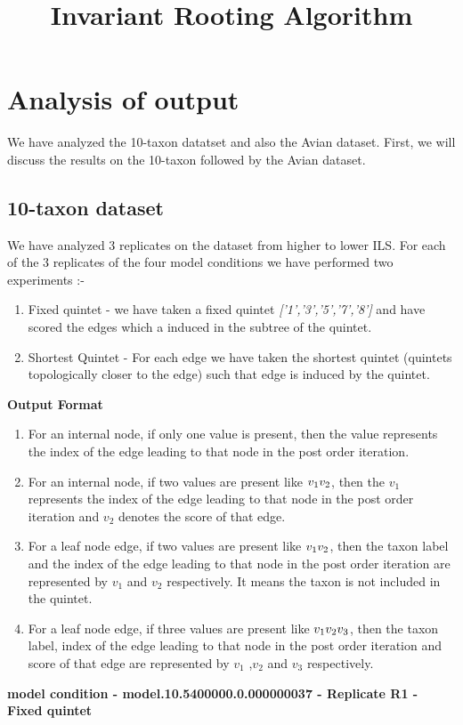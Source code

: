 \documentclass[letterpaper, 12pt]{article}
\title{ Invariant  Rooting  Algorithm }
\begin{document}
\maketitle

\section{Analysis of output}

 We have analyzed the 10-taxon datatset and also the Avian dataset. First, we will discuss the results on the 10-taxon followed by the Avian dataset.
 
 \subsection{10-taxon dataset}
 
 We have analyzed 3 replicates on the  dataset from higher to lower ILS. For each of the 3 replicates of the four model conditions we have performed two experiments :-
 
 \begin{enumerate}
 \item Fixed quintet - we have taken a fixed quintet {\em ['1','3','5','7','8'] } and have scored the edges which a induced in the subtree of the quintet. 
 \item Shortest Quintet - For each edge we have taken the shortest quintet (quintets topologically closer to the edge) such that edge is induced by the quintet.
 \end{enumerate}
 
 {\bf Output Format }
 \begin{enumerate}
 \item For an internal node, if only one value is present, then the value represents the index of the edge leading to that node in the post order iteration.
 \item For an internal node, if two values are present like $v_1\/v_2$, then the $v_1$ represents the index of the edge leading to that node in the post order iteration and $v_2$ denotes the score of that edge.
  \item For a leaf node edge, if two values are present like $v_1\/v_2$, then the taxon label and  the index of the edge leading to that node in the post order iteration are represented by  $v_1$  and $v_2$ respectively. It means the taxon is not included in the quintet.
 \item For a leaf node edge, if three values are present like $v_1\/v_2\/v_3$, then the taxon label,  index of the edge leading to that node in the post order iteration and score of that edge are represented by  $v_1$ ,$v_2$ and $v_3$ respectively. 

  \end{enumerate}
 {\bf  model condition - model.10.5400000.0.000000037 - Replicate R1 - Fixed quintet } \\
 
\end{document}
